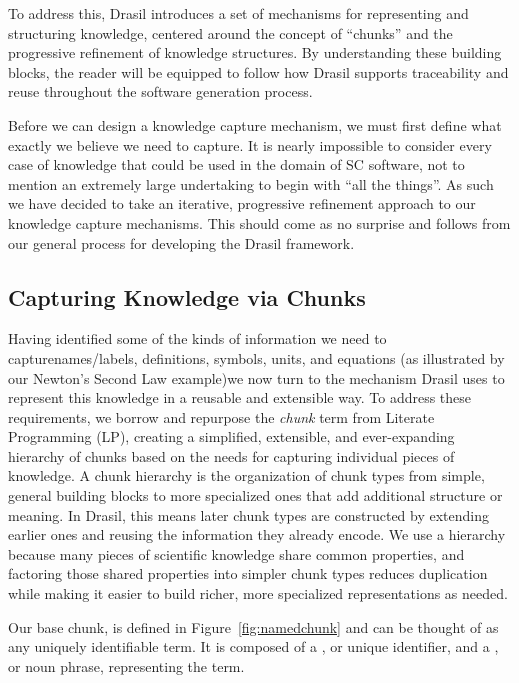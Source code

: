 To address this, Drasil introduces a set of mechanisms for representing and 
structuring knowledge, centered around the concept of ``chunks'' and the 
progressive refinement of knowledge structures. By understanding these building 
blocks, the reader will be equipped to follow how Drasil supports traceability 
and reuse throughout the software generation process.

Before we can design a knowledge capture mechanism, we must first define what 
exactly we believe we need to capture. It is nearly impossible to consider 
every case of knowledge that could be used in the domain of SC software, not to 
mention an extremely large undertaking to begin with ``all the things''. As
such we have decided to take an iterative, progressive refinement approach to 
our knowledge capture mechanisms. This should come as no surprise and follows 
from our general process for developing the Drasil framework.

\subsection{Capturing Knowledge via Chunks}
\label{sec:kcChunk}

Having identified some of the kinds of information we need to 
capture\textemdash{}names/labels, definitions, symbols, units, and equations 
(as illustrated by our Newton's Second Law example)\textemdash{}we now turn to 
the mechanism Drasil uses to represent this knowledge in a reusable and 
extensible way. To address these requirements, we borrow and repurpose the
\emph{chunk} term from Literate Programming (LP), creating a simplified, 
extensible, and ever-expanding hierarchy of chunks based on the needs for 
capturing individual pieces of knowledge. A chunk hierarchy is the 
organization of chunk types from simple, general building blocks to more 
specialized ones that add additional structure or meaning. In Drasil, this 
means later chunk types are constructed by extending earlier ones and reusing 
the information they already encode. We use a hierarchy because many pieces of 
scientific knowledge share common properties, and factoring those shared 
properties into simpler chunk types reduces duplication while making it easier 
to build richer, more specialized representations as needed.

Our base chunk,  is defined in Figure~\ref{fig:namedchunk} 
and can be thought of as any uniquely identifiable term. It is composed of a 
, or unique identifier, and a , or noun phrase, 
representing the term.

